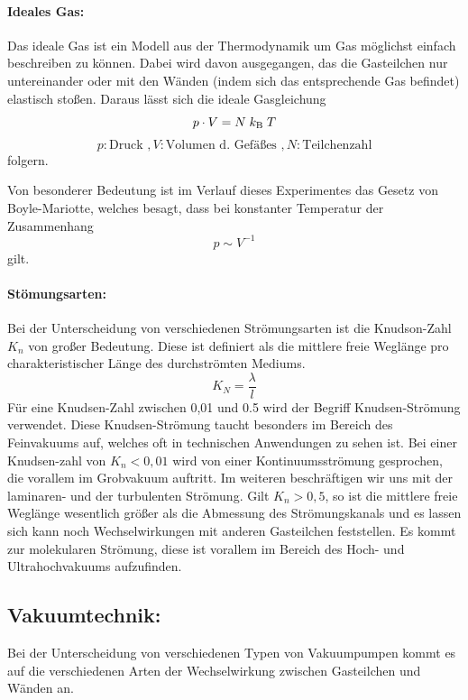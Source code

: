 \paragraph{Ideales Gas:}
Das ideale Gas ist ein Modell aus der Thermodynamik um Gas möglichst einfach beschreiben zu
können. Dabei wird davon ausgegangen, das die Gasteilchen nur untereinander oder mit den Wänden
(indem sich das entsprechende Gas befindet) elastisch stoßen. Daraus lässt sich die ideale Gasgleichung
\begin{equation}
  p \cdot V = N \;k_\text{B}\;T \\
  \label{eqn:ideal}
\end{equation}
\begin{equation*}
  p:\text{Druck }, V:\text{Volumen d. Gefäßes }, N:\text{Teilchenzahl}
\end{equation*}
folgern.

Von besonderer Bedeutung ist im Verlauf dieses Experimentes das Gesetz von Boyle-Mariotte, welches besagt,
dass bei konstanter Temperatur der Zusammenhang
\begin{equation}
  p \sim V^{-1}
\end{equation}
gilt.

\paragraph{Stömungsarten:}
Bei der Unterscheidung von verschiedenen Strömungsarten ist die Knudson-Zahl $K_n$ von großer
Bedeutung. Diese ist definiert als die mittlere freie Weglänge pro charakteristischer Länge des
durchströmten Mediums.
\begin{equation}
  K_N = \frac{\lambda}{l}
  \label{eqn:Knudsen}
\end{equation}
Für eine Knudsen-Zahl zwischen 0,01 und 0.5 wird der Begriff Knudsen-Strömung verwendet. Diese
Knudsen-Strömung taucht besonders im Bereich des Feinvakuums auf, welches oft in technischen Anwendungen
zu sehen ist.
Bei einer Knudsen-zahl von $K_n < 0,01$ wird von einer Kontinuumsströmung gesprochen, die vorallem im
Grobvakuum auftritt. Im weiteren beschräftigen wir uns mit der laminaren- und der turbulenten Strömung.
Gilt $K_n > 0,5$, so ist die mittlere freie Weglänge wesentlich größer als die Abmessung des Strömungskanals
und es lassen sich kann noch Wechselwirkungen mit anderen Gasteilchen feststellen. Es kommt zur molekularen
Strömung, diese ist vorallem im Bereich des Hoch- und Ultrahochvakuums aufzufinden.

\subsection{Vakuumtechnik:}
Bei der Unterscheidung von verschiedenen Typen von Vakuumpumpen kommt es auf die verschiedenen Arten der
Wechselwirkung zwischen Gasteilchen und Wänden an.

